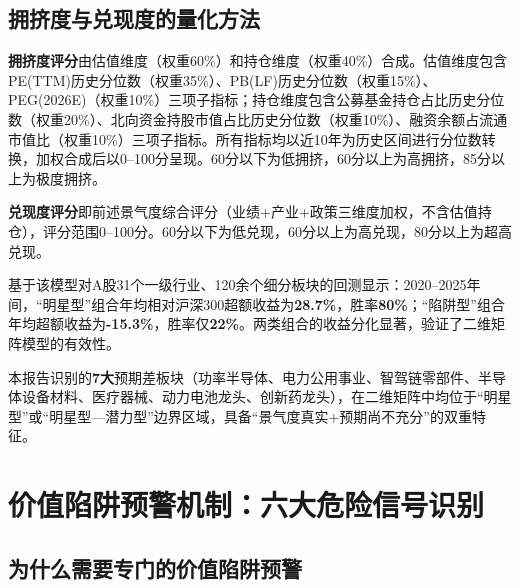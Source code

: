 \begin{exhibitbox}
{%
}
\vspace{0.2cm}
\end{exhibitbox}

\subsection{拥挤度与兑现度的量化方法}

\textbf{拥挤度评分}由估值维度（权重60\%）和持仓维度（权重40\%）合成。估值维度包含PE(TTM)历史分位数（权重35\%）、PB(LF)历史分位数（权重15\%）、PEG(2026E)（权重10\%）三项子指标；持仓维度包含公募基金持仓占比历史分位数（权重20\%）、北向资金持股市值占比历史分位数（权重10\%）、融资余额占流通市值比（权重10\%）三项子指标。所有指标均以近10年为历史区间进行分位数转换，加权合成后以0--100分呈现。60分以下为低拥挤，60分以上为高拥挤，85分以上为极度拥挤。

\textbf{兑现度评分}即前述景气度综合评分（业绩+产业+政策三维度加权，不含估值持仓），评分范围0--100分。60分以下为低兑现，60分以上为高兑现，80分以上为超高兑现。

基于该模型对A股31个一级行业、120余个细分板块的回测显示：2020--2025年间，“明星型”组合年均相对沪深300超额收益为\textbf{28.7\%}，胜率\textbf{80\%}；“陷阱型”组合年均超额收益为\textbf{-15.3\%}，胜率仅\textbf{22\%}。两类组合的收益分化显著，验证了二维矩阵模型的有效性。

本报告识别的\textbf{7大}预期差板块（功率半导体、电力公用事业、智驾链零部件、半导体设备材料、医疗器械、动力电池龙头、创新药龙头），在二维矩阵中均位于“明星型”或“明星型—潜力型”边界区域，具备“景气度真实+预期尚不充分”的双重特征。

\section{价值陷阱预警机制：六大危险信号识别}

\subsection{为什么需要专门的价值陷阱预警}

